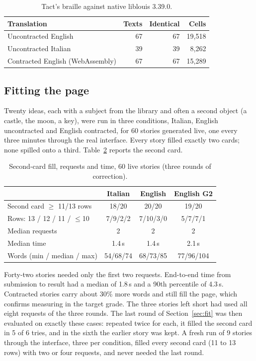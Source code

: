 \documentclass[conference]{IEEEtran}
\begin{document}
\begin{table}[t]
\caption{Tact's braille against native liblouis 3.39.0.}
\label{tab:braille}
\centering
\begin{tabular}{lrrr}
\toprule
Translation & Texts & Identical & Cells \\
\midrule
Uncontracted English & 67 & 67 & 19,518 \\
Uncontracted Italian & 39 & 39 & 8,262 \\
Contracted English (WebAssembly) & 67 & 67 & 15,289 \\
\bottomrule
\end{tabular}
\end{table}

\subsection{Fitting the page}\label{sec:evalfit}

Twenty ideas, each with a subject from the library and often a second object (a castle, the moon, a key), were run in three conditions, Italian, English uncontracted and English contracted, for 60 stories generated live, one every three minutes through the real interface. Every story filled exactly two cards; none spilled onto a third. Table~\ref{tab:fit} reports the second card.

\begin{table}[t]
\caption{Second-card fill, requests and time, 60 live stories (three rounds of correction).}
\label{tab:fit}
\centering
\begin{tabular}{lccc}
\toprule
 & Italian & English & English G2 \\
\midrule
Second card $\geq$ 11/13 rows & 18/20 & 20/20 & 19/20 \\
Rows: 13 / 12 / 11 / $\leq$10 & 7/9/2/2 & 7/10/3/0 & 5/7/7/1 \\
Median requests & 2 & 2 & 2 \\
Median time & 1.4\,s & 1.4\,s & 2.1\,s \\
Words (min / median / max) & 54/68/74 & 68/73/85 & 77/96/104 \\
\bottomrule
\end{tabular}
\end{table}

Forty-two stories needed only the first two requests. End-to-end time from submission to result had a median of 1.8\,s and a 90th percentile of 4.3\,s. Contracted stories carry about 30\% more words and still fill the page, which confirms measuring in the target grade. The three stories left short had used all eight requests of the three rounds. The last round of Section~\ref{sec:fit} was then evaluated on exactly these cases: repeated twice for each, it filled the second card in 5 of 6 tries, and in the sixth the earlier story was kept. A fresh run of 9 stories through the interface, three per condition, filled every second card (11 to 13 rows) with two or four requests, and never needed the last round.
\end{document}
